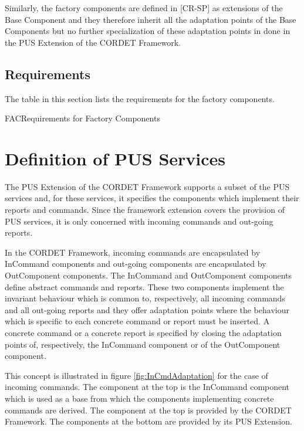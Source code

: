 \documentclass{pnp_article}
\begin{document}
Similarly, the factory components are defined in [CR-SP] as extensions of the Base Component and they therefore inherit all the adaptation points of the Base Components but no further specialization of these adaptation points in done in the PUS Extension of the CORDET Framework.

\subsection{Requirements}
The table in this section lists the requirements for the factory components.

\begin{crReq}{FAC}{Requirements for Factory Components}
\end{crReq}


\section{Definition of PUS Services}\label{sec:defPusRepCmd}
The PUS Extension of the CORDET Framework supports a subset of the PUS services and, for these services, it specifies the components which implement their reports and commands. Since the framework extension covers the provision of PUS services, it is only concerned with incoming commands and out-going reports. 

In the CORDET Framework, incoming commands are encapsulated by InCommand components and out-going components are encapsulated by OutComponent components. The InCommand and OutComponent components define abstract commands and reports. These two components implement the invariant behaviour which is common to, respectively, all incoming commands and all out-going reports and they offer adaptation points where the behaviour which is specific to each concrete command or report must be inserted. A concrete command or a concrete report is specified by closing the adaptation points of, respectively, the InCommand component or of the OutComponent component. 

This concept is illustrated in figure \ref{fig:InCmdAdaptation} for the case of incoming commands. The component at the top is the InCommand component which is used as a base from which the components implementing concrete commands are derived. The component at the top is provided by the CORDET Framework. The components at the bottom are provided by its PUS Extension. 
\end{document}
